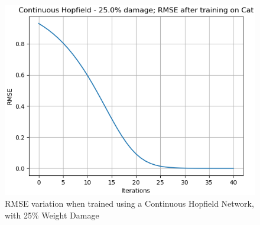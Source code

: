 \documentclass[12pt,a4paper]{article}
\begin{document}
\begin{figure}[H]
\includegraphics[scale=0.4]{images/chn_25_cat.png}
\caption{RMSE variation when trained using a Continuous Hopfield Network, with 25\% Weight Damage}
\end{figure}
\end{document}

